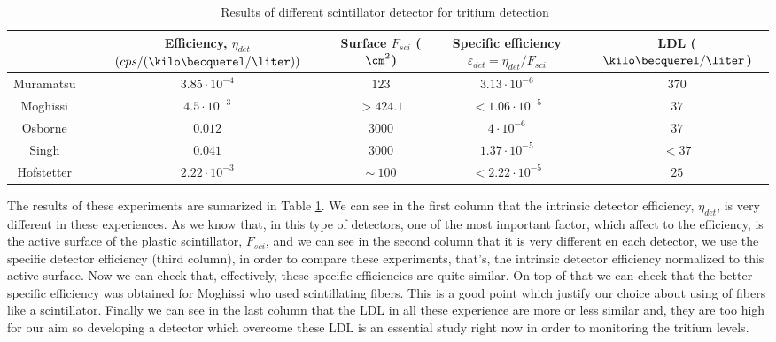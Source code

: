 \begin{table}[htbp]
\begin{center}
\begin{tabular}{|c|c|c|c|c|}
\hline
 & \parbox{6em}{\centering Efficiency, $\eta_{det}$\\ $(cps/(\kilo\becquerel/\liter))$}  & \parbox{5em}{\centering Surface\\ $F_{sci}$ ($\cm^2$)}  & \parbox{5em}{\centering Specific efficiency\\ $\varepsilon_{det}=\eta_{det}/F_{sci}$} & LDL ($\kilo\becquerel/\liter$)\\
\hline \hline \hline
Muramatsu & $3.85 \cdot 10^{-4}$ & $123$ & $3.13 \cdot 10^{-6}$ & $370$ \\ \hline
Moghissi & $4.5 \cdot 10^{-3}$ & $>424.1$ & $<1.06 \cdot 10^{-5}$ & $37$ \\ \hline
Osborne & $0.012$ & $3000$ & $4 \cdot 10^{-6}$ & $37$ \\ \hline
Singh & $0.041$ & $3000$ & $1.37 \cdot 10^{-5}$ & $<37$ \\ \hline
Hofstetter & $2.22 \cdot 10^{-3}$ & $\sim~100$ & $<2.22 \cdot 10^{-5}$ & $25$ \\ \hline
\end{tabular}
\caption{Results of different scintillator detector for tritium detection~\cite{TesisTritio}}
\label{tab:PlasticScinTritium}
\end{center}
\end{table}


The results of these experiments are sumarized in Table \ref{tab:PlasticScinTritium}. We can see in the first column that the intrinsic detector efficiency, $\eta_{det}$, is very different in these experiences. As we know that, in this type of detectors, one of the most important factor, which affect to the efficiency, is the active surface of the plastic scintillator, $F_{sci}$, and we can see in the second column that it is very different en each detector, we use the specific detector efficiency (third column), in order to compare these experiments, that's, the intrinsic detector efficiency normalized to this active surface. Now we can check that, effectively, these specific efficiencies are quite similar. On top of that we can check that the better specific efficiency was obtained for Moghissi who used scintillating fibers. This is a good point which justify our choice about using of fibers like a scintillator. Finally we can see in the last column that the LDL in all these experience are more or less similar and, they are too high for our aim so developing a detector which overcome these LDL is an essential study right now in order to monitoring the tritium levels. 